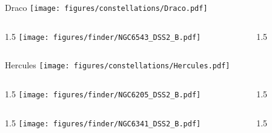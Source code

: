 \documentclass[final]{beamer}
\newlength{\colwidth}
\begin{document}

\begin{frame}[t]{\LARGE Draco}
  \centering
  \texttt{[image: figures/constellations/Draco.pdf]}
\end{frame}


\begin{frame}[t]{}
  \begin{columns}[T]
    \begin{column}{1.5\colwidth}
      \centering
      \texttt{[image: figures/finder/NGC6543\_DSS2\_B.pdf]}
    \end{column}
    \begin{column}{1.5\colwidth}
      \Large
      
    \end{column}
  \end{columns}
  \vspace{\fill}
\end{frame}


\begin{frame}[t]{\LARGE Hercules}
  \centering
  \texttt{[image: figures/constellations/Hercules.pdf]}
\end{frame}


\begin{frame}[t]{}
  \begin{columns}[T]
    \begin{column}{1.5\colwidth}
      \centering
      \texttt{[image: figures/finder/NGC6205\_DSS2\_B.pdf]}
    \end{column}
    \begin{column}{1.5\colwidth}
      \Large
      
    \end{column}
  \end{columns}
  \vspace{\fill}
  \begin{columns}[T]
    \begin{column}{1.5\colwidth}
      \centering
      \texttt{[image: figures/finder/NGC6341\_DSS2\_B.pdf]}
    \end{column}
    \begin{column}{1.5\colwidth}
      \Large
      
    \end{column}
  \end{columns}
\end{frame}
\end{document}
